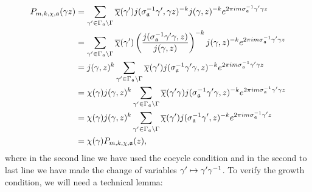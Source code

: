     \begin{align*}
      P_{m,k,\chi,\mathfrak{a}}(\gamma z) &= \sum_{\gamma' \in \Gamma_{\mathfrak{a}}\backslash\Gamma}\overline{\chi}(\gamma')j(\sigma_{\mathfrak{a}}^{-1}\gamma',\gamma z)^{-k}j(\gamma,z)^{-k}e^{2\pi im\sigma_{\mathfrak{a}}^{-1}\gamma'\gamma z} \\
      &= \sum_{\gamma' \in \Gamma_{\mathfrak{a}}\backslash\Gamma}\overline{\chi}(\gamma')\left(\frac{j(\sigma_{\mathfrak{a}}^{-1}\gamma'\gamma,z)}{j(\gamma,z)}\right)^{-k}j(\gamma,z)^{-k}e^{2\pi im\sigma_{\mathfrak{a}}^{-1}\gamma'\gamma z} \\
      &= j(\gamma,z)^{k}\sum_{\gamma' \in \Gamma_{\mathfrak{a}}\backslash\Gamma}\overline{\chi}(\gamma')j(\sigma_{\mathfrak{a}}^{-1}\gamma'\gamma,z)^{-k}e^{2\pi im\sigma_{\mathfrak{a}}^{-1}\gamma'\gamma z} \\
      &= \chi(\gamma)j(\gamma,z)^{k}\sum_{\gamma' \in \Gamma_{\mathfrak{a}}\backslash\Gamma}\overline{\chi}(\gamma'\gamma)j(\sigma_{\mathfrak{a}}^{-1}\gamma'\gamma,z)^{-k}e^{2\pi im\sigma_{\mathfrak{a}}^{-1}\gamma'\gamma z} \\
      &= \chi(\gamma)j(\gamma,z)^{k}\sum_{\gamma' \in \Gamma_{\mathfrak{a}}\backslash\Gamma}\overline{\chi}(\gamma')j(\sigma_{\mathfrak{a}}^{-1}\gamma',z)^{-k}e^{2\pi im\sigma_{\mathfrak{a}}^{-1}\gamma' z} \\
      &= \chi(\gamma)P_{m,k,\chi,\mathfrak{a}}(z),
    \end{align*}
    where in the second line we have used the cocycle condition and in the second to last line we have made the change of variables $\gamma' \mapsto \gamma'\gamma^{-1}$. To verify the growth condition, we will need a technical lemma:


